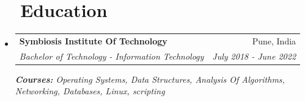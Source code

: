 \documentclass[a4paper,20pt]{article}
\makeatletter
\newcommand{\resumeItem}[2]{
  \item\small{
    \textbf{#1}{#2 \vspace{-2pt}}
  }
}
\newcommand{\resumeSubheading}[4]{
  \vspace{1pt}\item
    \begin{tabular*}{0.97\textwidth}{l@{\extracolsep{\fill}}r}
      \textbf{#1} & #2 \\
      \textit{#3} & \textit{#4} \\
    \end{tabular*}\vspace{-5pt}
}
\newcommand{\resumeSubItem}[2]{\resumeItem{#1}{#2}\vspace{-1pt}}
\newcommand{\resumeSubHeadingListStart}{\begin{itemize}[leftmargin=*]}
\newcommand{\resumeSubHeadingListEnd}{\end{itemize}}
\makeatother
\begin{document}





\vspace{2pt}
\section{~~Education}
  \resumeSubHeadingListStart
  \vspace{2pt}
    \resumeSubheading
      {Symbiosis Institute Of Technology}{Pune, India}
      {Bachelor of Technology - Information Technology}{July 2018 - June 2022}
      {\scriptsize \textit{ \footnotesize{\newline{}\textbf{Courses:} Operating Systems, Data Structures, Analysis Of Algorithms, Networking, Databases, Linux, scripting}}}
    \resumeSubHeadingListEnd



\end{document}
